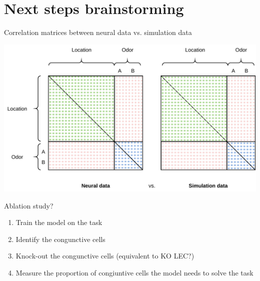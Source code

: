 \documentclass[bigger]{beamer}
\begin{document}
\section{Next steps brainstorming}
\label{sec:orge4451af}
\begin{frame}[label={sec:orgf5706ab}]{Correlation matrices between neural data vs. simulation data}
\begin{center}
\includegraphics[width=.9\linewidth]{img/activation-matrix.drawio.pdf}
\end{center}
\end{frame}
\begin{frame}[label={sec:org7fe6e7d}]{Ablation study?}
\begin{enumerate}
\item Train the model on the task
\item Identify the congunctive cells
\item Knock-out the congunctive cells (equivalent to KO LEC?)
\item Measure the proportion of congiuntive cells the model needs to solve the task
\end{enumerate}
\end{frame}
\end{document}
